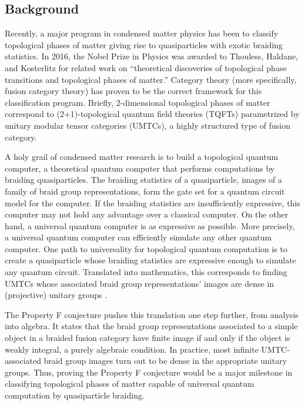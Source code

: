 \documentclass[12pt]{article}
\theoremstyle{definition}
\begin{document}
\subsection*{Background}

Recently, a major program in condensed matter physics has been to classify topological phases of matter giving rise to quasiparticles with exotic braiding statistics. In 2016, the Nobel Prize in Physics was awarded to Thouless, Haldane, and Kosterlitz for related work on ``theoretical discoveries of topological phase transitions and topological phases of matter.'' Category theory (more specifically, fusion category theory) has proven to be the correct framework for this classification program. Briefly, 2-dimensional topological phases of matter correspond to (2+1)-topological quantum field theories (TQFTs) parametrized by unitary modular tensor categories (UMTCs), a highly structured type of fusion category. 

A holy grail of condensed matter research is to build a topological quantum computer, a theoretical quantum computer that performs computations by braiding quasiparticles. The braiding statistics of a quasiparticle, images of a family of braid group representations, form the gate set for a quantum circuit model for the computer. If the braiding statistics are insufficiently expressive, this computer may not hold any advantage over a classical computer. On the other hand, a universal quantum computer is as expressive as possible. More precisely, a universal quantum computer can efficiently simulate any other quantum computer.  One path to universality for topological quantum computation is to create a quasiparticle whose braiding statistics are expressive enough to simulate any quantum circuit.  Translated into mathematics, this corresponds to finding UMTCs whose associated braid group representations' images are dense in (projective) unitary groups \cite{flw}.

The Property F conjecture \cite{nr} pushes this translation one step further, from analysis into algebra.  It states that the braid group representations associated to a simple object in a braided fusion category have finite image if and only if the object is weakly integral, a purely algebraic condition.  In practice, most infinite UMTC-associated braid group images turn out to be dense in the appropriate unitary groups.  Thus, proving the Property F conjecture would be a major milestone in classifying topological phases of matter capable of universal quantum computation by quasiparticle braiding.
\end{document}
